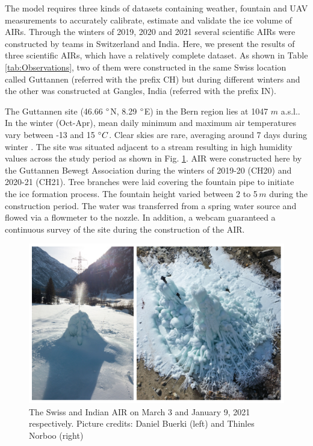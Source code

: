 \documentclass[utf8]{frontiersSCNS} %
\begin{document}
The model requires three kinds of datasets containing weather, fountain and UAV measurements to accurately calibrate,
estimate and validate the ice volume of AIRs. Through the winters of 2019, 2020 and 2021 several scientific AIRs were
constructed by teams in Switzerland and India. Here, we present the results of three scientific AIRs, which have a
relatively complete dataset. As shown in Table \ref{tab:Observations}, two of them were constructed in the same Swiss
location called Guttannen (referred with the prefix CH) but during different winters and the other was constructed at
Gangles, India (referred with the prefix IN).

The Guttannen site (46.66 $\degree$N, 8.29 $\degree$E) in the Bern region lies at 1047 $m$ a.s.l.. In the winter
(Oct-Apr), mean daily minimum and maximum air temperatures vary between -13 and 15 $\degree C$. Clear skies are rare,
averaging around 7 days during winter \citep{guttannen}. The site was situated adjacent to a stream resulting in high
humidity values across the study period as shown in Fig. \ref{fig:2AIR}. AIR were constructed here by the Guttannen
Bewegt Association during the winters of 2019-20 (CH20) and 2020-21 (CH21). Tree branches were laid covering the
fountain pipe to initiate the ice formation process. The fountain height varied between 2 to 5\,$m$ during the
construction period. The water was transferred from a spring water source and flowed via a flowmeter to the nozzle. In
addition, a webcam guaranteed a continuous survey of the site during the construction of the AIR.

\begin{figure}
	\begin{center}
		\includegraphics[width=12 cm]{Figures/2AIR.jpg}
	\end{center}
	\caption{The Swiss and Indian AIR on March 3 and January 9, 2021 respectively. Picture credits: Daniel Buerki (left)
		and Thinles Norboo (right)}
	\label{fig:2AIR}
\end{figure}
\end{document}
